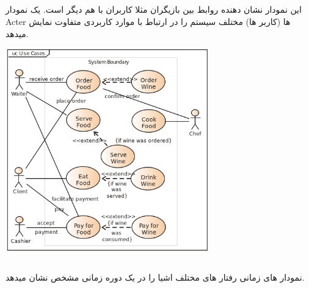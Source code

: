 \documentclass[22pt, a4]{article}
\begin{document}
\newpage
\subsection{}
این نمودار نشان دهنده روابط بین بازیگران مثلا کاربران با هم دیگر است.
یک نمودار
Acter
ها (کاربر ها) مختلف سیستم را در ارتباط با موارد کاربردی متفاوت نمایش میدهد.

{\par\center\includegraphics[width=250pt]{img/496px-Use_case_restaurant_model.svg.png}\par}

\newpage
\subsection{}
نمودار های زمانی رفتار های مختلف اشیا را در یک دوره زمانی مشخص نشان میدهد.
\end{document}
